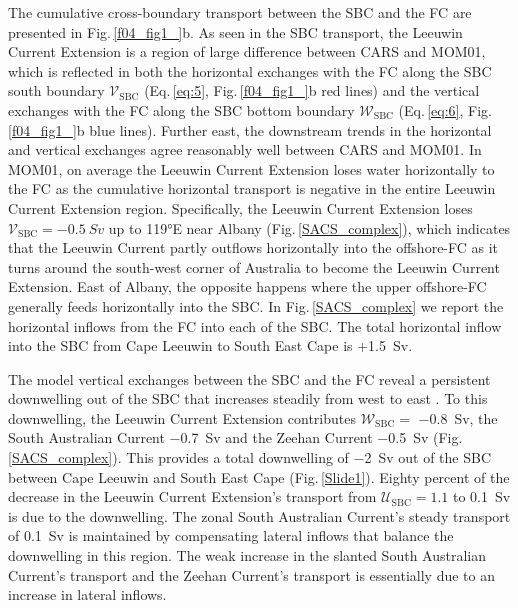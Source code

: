 \documentclass[preprint,3p,review,12pt]{elsarticle}
\newcommand{\sub}[1]{_{\text{#1}}}
\begin{document}
The cumulative cross-boundary transport between the SBC and the FC are presented in Fig.\,\ref{f04_fig1_}b. As seen in the SBC transport, the Leeuwin Current Extension is a region of large difference
between CARS and MOM01,
which is reflected in both the horizontal exchanges with the FC along the SBC south boundary $\mathcal{V}\sub{SBC}$ (Eq.\,\ref{eq:5}, Fig.\,\ref{f04_fig1_}b red lines) and the vertical exchanges with the FC along the SBC bottom boundary $\mathcal{W}\sub{SBC}$ (Eq.\,\ref{eq:6}, Fig.\,\ref{f04_fig1_}b blue lines).
Further east, the downstream trends in the horizontal and vertical exchanges agree reasonably well between CARS and MOM01.
In MOM01, on average the Leeuwin Current Extension loses water horizontally to the FC as the cumulative horizontal transport is negative in the entire Leeuwin Current Extension region. Specifically, the Leeuwin Current Extension loses $\mathcal{V}\sub{SBC} = \SI{-0.5}{Sv}$ up to \ang{119}E near Albany (Fig.\,\ref{SACS_complex}), which indicates
that the Leeuwin Current partly outflows horizontally into the offshore-FC as it turns around the south-west corner of Australia to become the Leeuwin Current Extension\@. East of Albany, the opposite happens where the upper offshore-FC generally feeds horizontally into the SBC\@. In Fig.\,\ref{SACS_complex} we report the horizontal inflows from the FC into each of the SBC. The total horizontal inflow into the SBC from Cape Leeuwin to South East Cape is +\SI{1.5}{Sv}.

The model vertical exchanges between the SBC and the FC reveal a persistent downwelling out of the SBC that increases steadily from west to east \@. To this downwelling, the Leeuwin Current Extension contributes $\mathcal{W}\sub{SBC} =$ \SI{-0.8}{Sv}, the South Australian Current \SI{-0.7}{Sv} and the Zeehan Current \SI{-0.5}{Sv} (Fig.\,\ref{SACS_complex}). This provides a total downwelling of \SI{-2}{Sv} out of the SBC between Cape Leeuwin and South East Cape (Fig.\,\ref{Slide1}).
Eighty percent of the decrease in the Leeuwin Current Extension's transport from
$\mathcal{U}\sub{SBC} = \num{1.1}$ to \SI{0.1}{Sv} is
due to the downwelling.
The zonal South Australian Current's steady transport of \SI{0.1}{Sv} is maintained by compensating lateral inflows that balance the downwelling in this region. The weak increase
in the slanted South Australian Current's transport and the Zeehan Current's transport is essentially due to an increase in lateral inflows.
\end{document}
